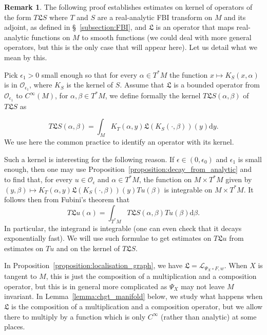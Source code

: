 \documentclass[10pt]{amsart}
\theoremstyle{definition}\newtheorem{defi}[theo]{Definition}\newtheorem{rema}[theo]{Remark}\newtheorem{exam}[theo]{Example}\newtheorem{exem}[theo]{Example}\newtheorem{nota}[theo]{Notation}
\newcommand{\clO}{\mathcal{O}}
\newcommand{\clL}{\mathcal{L}}
\newcommand{\fkL}{\mathfrak{L}}
\newcommand{\rmd}{\mathrm{d}}
\begin{document}
\begin{rema}\label{remark:meaning_kernel}
The following proof establishes estimates on kernel of operators of the form $T \fkL S$ where $T$ and $S$ are a real-analytic FBI transform on $M$ and its adjoint, as defined in \S~\ref{subsection:FBI}, and $\fkL$ is an operator that maps real-analytic functions on $M$ to smooth functions (we could deal with more general operators, but this is the only case that will appear here). Let us detail what we mean by this.

Pick $\epsilon_1 > 0$ small enough so that for every $\alpha \in T^* M$ the function $x \mapsto K_S(x,\alpha)$ is in $\clO_{\epsilon_1}$, where $K_S$ is the kernel of $S$. Assume that $\fkL$ is a bounded operator from $\clO_{\epsilon_1}$ to $C^\infty(M)$, for $\alpha,\beta \in T^* M$, we define formally the kernel $T \fkL S (\alpha,\beta)$ of $T\fkL S$ as

\begin{equation*}
T\fkL S(\alpha,\beta) = \int_M K_T(\alpha,y) \fkL(K_S(\cdot,\beta))(y) \rmd y.
\end{equation*}
We use here the common practice to identify an operator with its kernel.

Such a kernel is interesting for the following reason. If $\epsilon \in (0,\epsilon_0)$ and $\epsilon_1$ is small enough, then one may use Proposition~\ref{proposition:decay_from_analytic} and~\cite[Lemma~2.5]{BJ20} to find that, for every $u \in \clO_\epsilon$ and $\alpha \in T^* M$, the function on $M \times T^* M$ given by $(y,\beta) \mapsto K_T(\alpha,y) \fkL(K_S(\cdot,\beta))(y) Tu(\beta)$ is integrable on $M \times T^* M$. It follows then from Fubini's theorem that
\begin{equation}\label{eq:usage_kernel}
T \fkL u(\alpha) = \int_{T^* M} T\fkL S(\alpha,\beta) Tu(\beta) \rmd \beta.
\end{equation}
In particular, the integrand is integrable (one can even check that it decays exponentially fast). We will use such formulae to get estimates on $T\fkL u$ from estimates on $Tu$ and on the kernel of $T\fkL S$.

In Proposition~\ref{proposition:localisation_graph}, we have $\fkL = \clL_{\Psi_X \circ F, w}$. When $X$ is tangent to $M$, this is just the composition of a multiplication and a composition operator, but this is in general more complicated as $\Psi_X$ may not leave $M$ invariant. In Lemma~\ref{lemma:chgt_manifold} below, we study what happens when $\fkL$ is the composition of a multiplication and a composition operator, but we allow there to multiply by a function which is only $C^\infty$ (rather than analytic) at some places.
\end{rema}
\end{document}

